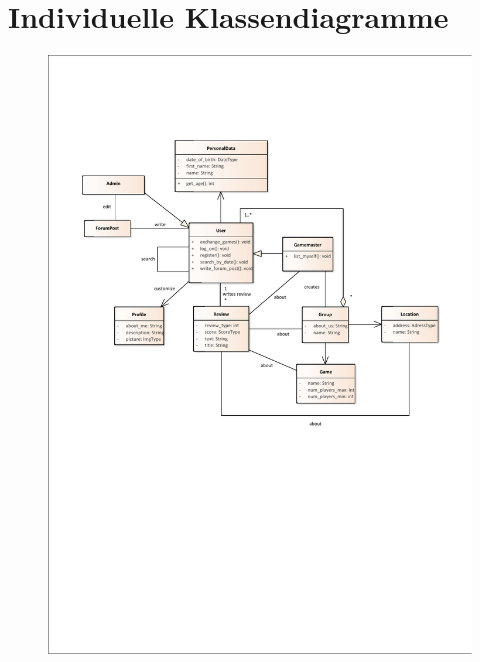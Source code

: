 \section{Individuelle Klassendiagramme}
	\label{app:C_Klassendiagramme}
	\begin{figure}[h!]
		\centering
		\includegraphics[width = 0.8\linewidth]{docs/5_Klassendiagramme/classdiagram_richard.pdf}
		\label{fig:ClassDia_Richard}
	\end{figure}